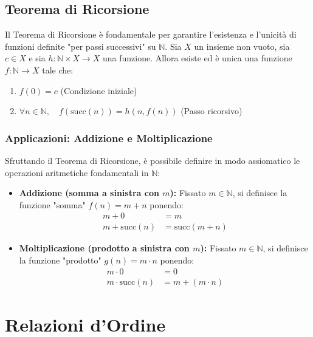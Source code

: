 \documentclass[12pt, a4paper]{article}
\begin{document}
\subsection{Teorema di Ricorsione}
Il Teorema di Ricorsione è fondamentale per garantire l'esistenza e l'unicità di funzioni definite "per passi successivi" su $\mathbb{N}$.
Sia $X$ un insieme non vuoto, sia $c \in X$ e sia $h: \mathbb{N} \times X \to X$ una funzione. Allora esiste ed è unica una funzione $f: \mathbb{N} \to X$ tale che:
\begin{enumerate}
    \item $f(0) = c$ \quad (Condizione iniziale)
    \item $\forall n \in \mathbb{N}, \quad f(\text{succ}(n)) = h(n, f(n))$ \quad (Passo ricorsivo)
\end{enumerate}

\subsubsection{Applicazioni: Addizione e Moltiplicazione}
Sfruttando il Teorema di Ricorsione, è possibile definire in modo assiomatico le operazioni aritmetiche fondamentali in $\mathbb{N}$:
\begin{itemize}
    \item \textbf{Addizione (somma a sinistra con $m$):} Fissato $m \in \mathbb{N}$, si definisce la funzione "somma" $f(n) = m + n$ ponendo:
    \begin{align*}
        m + 0 &= m \\
        m + \text{succ}(n) &= \text{succ}(m + n)
    \end{align*}
    \item \textbf{Moltiplicazione (prodotto a sinistra con $m$):} Fissato $m \in \mathbb{N}$, si definisce la funzione "prodotto" $g(n) = m \cdot n$ ponendo:
    \begin{align*}
        m \cdot 0 &= 0 \\
        m \cdot \text{succ}(n) &= m + (m \cdot n)
    \end{align*}
\end{itemize}


\section{Relazioni d'Ordine}
\end{document}
